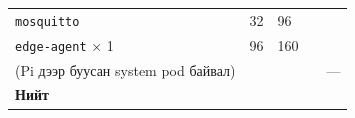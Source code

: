 \begin{longtable}[]{@{}lllll@{}}
\begin{minipage}[t]{0.17\columnwidth}\raggedright
\texttt{mosquitto}\strut
\end{minipage} & \begin{minipage}[t]{0.17\columnwidth}\raggedright
32\strut
\end{minipage} & \begin{minipage}[t]{0.17\columnwidth}\raggedright
96\strut
\end{minipage} & \begin{minipage}[t]{0.17\columnwidth}\raggedright
\strut
\end{minipage} & \begin{minipage}[t]{0.17\columnwidth}\raggedright
\strut
\end{minipage}\tabularnewline
\begin{minipage}[t]{0.17\columnwidth}\raggedright
\texttt{edge-agent} × 1\strut
\end{minipage} & \begin{minipage}[t]{0.17\columnwidth}\raggedright
96\strut
\end{minipage} & \begin{minipage}[t]{0.17\columnwidth}\raggedright
160\strut
\end{minipage} & \begin{minipage}[t]{0.17\columnwidth}\raggedright
\strut
\end{minipage} & \begin{minipage}[t]{0.17\columnwidth}\raggedright
\strut
\end{minipage}\tabularnewline
\begin{minipage}[t]{0.17\columnwidth}\raggedright
(Pi дээр буусан system pod байвал)\strut
\end{minipage} & \begin{minipage}[t]{0.17\columnwidth}\raggedright
\strut
\end{minipage} & \begin{minipage}[t]{0.17\columnwidth}\raggedright
\strut
\end{minipage} & \begin{minipage}[t]{0.17\columnwidth}\raggedright
\strut
\end{minipage} & \begin{minipage}[t]{0.17\columnwidth}\raggedright
---\strut
\end{minipage}\tabularnewline
\begin{minipage}[t]{0.17\columnwidth}\raggedright
\textbf{Нийт}\strut
\end{minipage} & \begin{minipage}[t]{0.17\columnwidth}\raggedright

\end{minipage}
\end{longtable}
